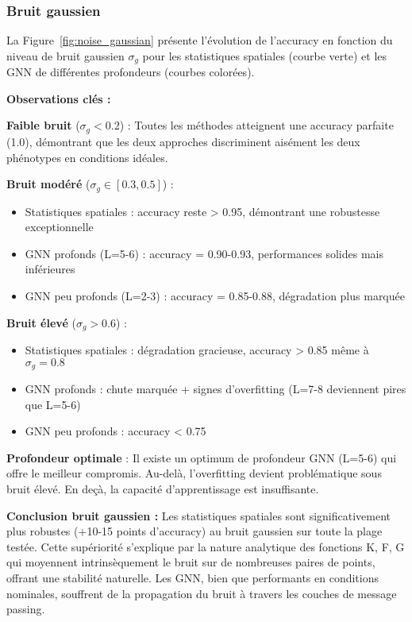 \subsubsection{Bruit gaussien}

La Figure~\ref{fig:noise_gaussian} présente l'évolution de l'accuracy en fonction du niveau de bruit gaussien $\sigma_g$ pour les statistiques spatiales (courbe verte) et les GNN de différentes profondeurs (courbes colorées).

\textbf{Observations clés :}

\textbf{Faible bruit} ($\sigma_g < 0.2$) : Toutes les méthodes atteignent une accuracy parfaite (1.0), démontrant que les deux approches discriminent aisément les deux phénotypes en conditions idéales.

\textbf{Bruit modéré} ($\sigma_g \in [0.3, 0.5]$) :
\begin{itemize}
    \item Statistiques spatiales : accuracy reste > 0.95, démontrant une robustesse exceptionnelle
    \item GNN profonds (L=5-6) : accuracy = 0.90-0.93, performances solides mais inférieures
    \item GNN peu profonds (L=2-3) : accuracy = 0.85-0.88, dégradation plus marquée
\end{itemize}

\textbf{Bruit élevé} ($\sigma_g > 0.6$) :
\begin{itemize}
    \item Statistiques spatiales : dégradation gracieuse, accuracy > 0.85 même à $\sigma_g = 0.8$
    \item GNN profonds : chute marquée + signes d'overfitting (L=7-8 deviennent pires que L=5-6)
    \item GNN peu profonds : accuracy < 0.75
\end{itemize}

\textbf{Profondeur optimale} : Il existe un optimum de profondeur GNN (L=5-6) qui offre le meilleur compromis. Au-delà, l'overfitting devient problématique sous bruit élevé. En deçà, la capacité d'apprentissage est insuffisante.

\textbf{Conclusion bruit gaussien :} Les statistiques spatiales sont significativement plus robustes (+10-15 points d'accuracy) au bruit gaussien sur toute la plage testée. Cette supériorité s'explique par la nature analytique des fonctions K, F, G qui moyennent intrinsèquement le bruit sur de nombreuses paires de points, offrant une stabilité naturelle. Les GNN, bien que performants en conditions nominales, souffrent de la propagation du bruit à travers les couches de message passing.

